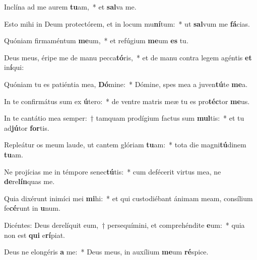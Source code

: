 \item Inclína ad me aurem \textbf{tu}am,~* et \textbf{sal}va me.
\item Esto mihi in Deum protectórem, et in locum mu\textbf{ní}tum:~* ut \textbf{sal}vum me \textbf{fá}cias.
\item Quóniam firmaméntum \textbf{me}um,~* et refúgium \textbf{me}um \textbf{es} tu.
\item Deus meus, éripe me de manu pecca\textbf{tó}ris,~* et de manu contra legem agéntis \textbf{et} in\textbf{í}qui:
\item Quóniam tu es patiéntia mea, \textbf{Dó}mine:~* Dómine, spes mea a juven\textbf{tú}te \textbf{me}a.
\item In te confirmátus sum ex \textbf{ú}tero:~* de ventre matris meæ tu es pro\textbf{téc}tor \textbf{me}us.
\item In te cantátio mea semper:~† tamquam prodígium factus sum \textbf{mul}tis:~* et tu ad\textbf{jú}tor \textbf{for}tis.
\item Repleátur os meum laude, ut cantem glóriam \textbf{tu}am:~* tota die magni\textbf{tú}dinem \textbf{tu}am.
\item Ne projícias me in témpore senec\textbf{tú}tis:~* cum defécerit virtus mea, ne \textbf{de}re\textbf{lín}quas me.
\item Quia dixérunt inimíci mei \textbf{mi}hi:~* et qui custodiébant ánimam meam, consílium fe\textbf{cé}runt in \textbf{u}num.
\item Dicéntes: Deus derelíquit eum,~† persequímini, et comprehéndite \textbf{e}um:~* quia non est \textbf{qui} e\textbf{rí}piat.
\item Deus ne elongéris \textbf{a} me:~* Deus meus, in auxílium \textbf{me}um \textbf{ré}spice.
